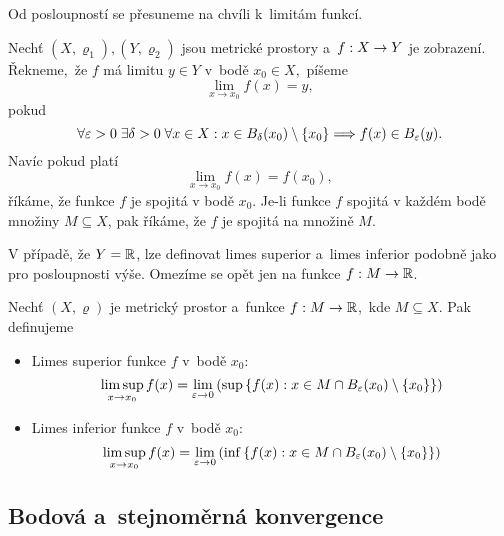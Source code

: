 Od posloupností se přesuneme na chvíli k~limitám funkcí.
\begin{definition}\label{def:limita-fce-v-bode}
    Nechť $(X,\varrho_1),(Y,\varrho_2)$ jsou metrické prostory a~$f:X \rightarrow Y$ je zobrazení. Řekneme,~že $f$ má limitu $y\in Y$ v~bodě $x_0\in X$,~píšeme
    \[\lim_{x\to x_0}f(x)=y,\]
    pokud
    \[\forall \varepsilon >0\;\exists \delta >0\;\forall x\in X: x\in B_\delta(x_0)\setminus\left\{x_0\right\}\Longrightarrow f(x)\in B_\varepsilon(y).\]
    Navíc pokud platí
    \[\lim_{x\to x_0}f(x)=f(x_0),\]
    říkáme, že funkce $f$ je spojitá v bodě $x_0$. Je-li funkce $f$ spojitá v každém bodě množiny $M\subseteq X$, pak říkáme, že $f$ je spojitá na množině $M$.
\end{definition}
V případě, že $Y=\mathbb{R}$, lze definovat limes superior a~limes inferior podobně jako pro posloupnosti výše. Omezíme se opět jen na funkce $f:M \rightarrow \mathbb{R}$.
\begin{definition}\label{def:limsup-liminf-funkce}
    Nechť $(X,\varrho)$ je metrický prostor a~funkce $f:M \rightarrow \mathbb{R}$,~kde $M\subseteq X$. Pak definujeme
    \begin{itemize}
        \item Limes superior funkce $f$ v~bodě $x_0$:
        \[\limsup _{x\to x_0}f(x)=\lim _{\varepsilon \to 0}\left(\sup\left\{f(x):x\in M\cap B_\varepsilon(x_0)\setminus \{x_0\}\right\}\right)\]
        \item Limes inferior funkce $f$ v~bodě $x_0$:
        \[\limsup _{x\to x_0}f(x)=\lim _{\varepsilon \to 0}\left(\inf\left\{f(x):x\in M\cap B_\varepsilon(x_0)\setminus \{x_0\}\right\}\right)\]
    \end{itemize}
\end{definition}

\subsection{Bodová a~stejnoměrná konvergence}\label{subsec:bodova-stejnomerna-konvergence}

